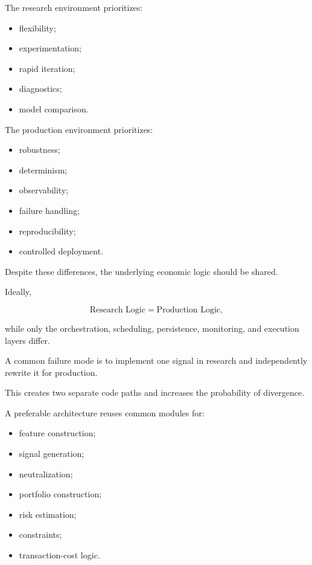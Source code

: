 \documentclass[11pt,a4paper]{article}
\begin{document}
The research environment prioritizes:

\begin{itemize}
    \item flexibility;
    \item experimentation;
    \item rapid iteration;
    \item diagnostics;
    \item model comparison.
\end{itemize}

The production environment prioritizes:

\begin{itemize}
    \item robustness;
    \item determinism;
    \item observability;
    \item failure handling;
    \item reproducibility;
    \item controlled deployment.
\end{itemize}

Despite these differences, the underlying economic logic should be shared.

Ideally,

\begin{equation}
\boxed{
\text{Research Logic}
=
\text{Production Logic},
}
\end{equation}

while only the orchestration, scheduling, persistence, monitoring, and execution
layers differ.

A common failure mode is to implement one signal in research and independently
rewrite it for production.

This creates two separate code paths and increases the probability of divergence.

A preferable architecture reuses common modules for:

\begin{itemize}
    \item feature construction;
    \item signal generation;
    \item neutralization;
    \item portfolio construction;
    \item risk estimation;
    \item constraints;
    \item transaction-cost logic.
\end{itemize}
\end{document}
